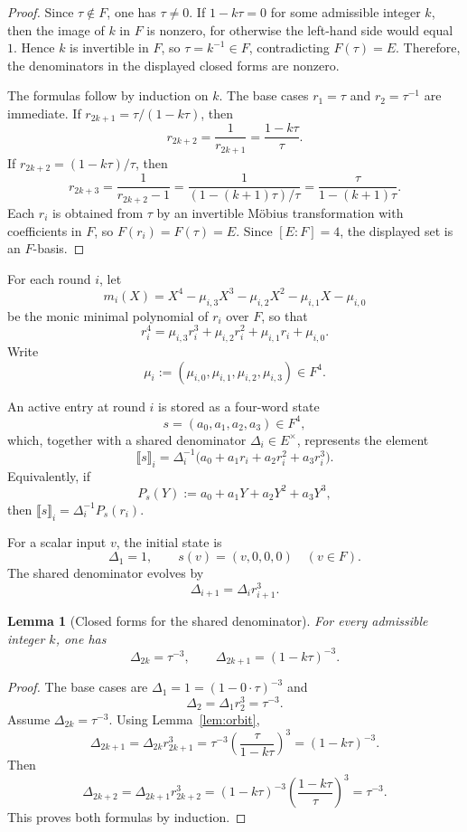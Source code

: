 \documentclass[11pt]{article}
\newtheorem{lemma}[theorem]{Lemma}
\begin{document}
\begin{proof}
Since \(\tau\notin F\), one has \(\tau\neq 0\). If \(1-k\tau=0\) for some admissible integer \(k\), then the image of \(k\) in \(F\) is nonzero, for otherwise the left-hand side would equal \(1\). Hence \(k\) is invertible in \(F\), so \(\tau=k^{-1}\in F\), contradicting \(F(\tau)=E\). Therefore, the denominators in the displayed closed forms are nonzero.

The formulas follow by induction on \(k\). The base cases \(r_1=\tau\) and \(r_2=\tau^{-1}\) are immediate. If \(r_{2k+1}=\tau/(1-k\tau)\), then
\[
r_{2k+2}=\frac{1}{r_{2k+1}}=\frac{1-k\tau}{\tau}.
\]
If \(r_{2k+2}=(1-k\tau)/\tau\), then
\[
r_{2k+3}=\frac{1}{r_{2k+2}-1}=\frac{1}{(1-(k+1)\tau)/\tau}=\frac{\tau}{1-(k+1)\tau}.
\]
Each \(r_i\) is obtained from \(\tau\) by an invertible M\"obius transformation with coefficients in \(F\), so \(F(r_i)=F(\tau)=E\). Since \([E:F]=4\), the displayed set is an \(F\)-basis.
\end{proof}

For each round \(i\), let
\[
m_i(X)=X^4-\mu_{i,3}X^3-\mu_{i,2}X^2-\mu_{i,1}X-\mu_{i,0}
\]
be the monic minimal polynomial of \(r_i\) over \(F\), so that
\[
r_i^4=\mu_{i,3}r_i^3+\mu_{i,2}r_i^2+\mu_{i,1}r_i+\mu_{i,0}.
\]
Write
\[
\mu_i:=(\mu_{i,0},\mu_{i,1},\mu_{i,2},\mu_{i,3})\in F^4.
\]

An active entry at round \(i\) is stored as a four-word state
\[
s=(a_0,a_1,a_2,a_3)\in F^4,
\]
which, together with a shared denominator \(\Delta_i\in E^\times\), represents the element
\[
\llbracket s\rrbracket_i
=
\Delta_i^{-1}\big(a_0+a_1r_i+a_2r_i^2+a_3r_i^3\big).
\]
Equivalently, if
\[
P_s(Y):=a_0+a_1Y+a_2Y^2+a_3Y^3,
\]
then \(\llbracket s\rrbracket_i=\Delta_i^{-1}P_s(r_i)\).

For a scalar input \(v\), the initial state is
\[
\Delta_1=1,
\qquad
s(v)=(v,0,0,0)\quad(v\in F).
\]
The shared denominator evolves by
\[
\Delta_{i+1}=\Delta_i r_{i+1}^3.
\]

\begin{lemma}[Closed forms for the shared denominator]
\label{lem:delta}
For every admissible integer \(k\), one has
\[
\Delta_{2k}=\tau^{-3},
\qquad
\Delta_{2k+1}=(1-k\tau)^{-3}.
\]
\end{lemma}

\begin{proof}
The base cases are \(\Delta_1=1=(1-0\cdot\tau)^{-3}\) and
\[
\Delta_2=\Delta_1 r_2^3=\tau^{-3}.
\]
Assume \(\Delta_{2k}=\tau^{-3}\). Using Lemma~\ref{lem:orbit},
\[
\Delta_{2k+1}=\Delta_{2k}r_{2k+1}^3
=\tau^{-3}\left(\frac{\tau}{1-k\tau}\right)^3
=(1-k\tau)^{-3}.
\]
Then
\[
\Delta_{2k+2}=\Delta_{2k+1}r_{2k+2}^3
=(1-k\tau)^{-3}\left(\frac{1-k\tau}{\tau}\right)^3
=\tau^{-3}.
\]
This proves both formulas by induction.
\end{proof}
\end{document}
